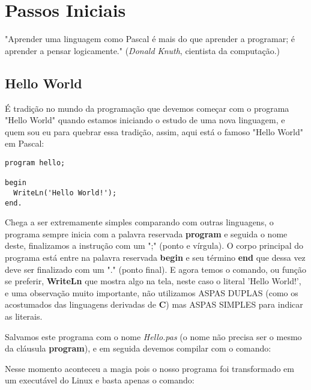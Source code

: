 \chapter{Passos Iniciais}

\begin{remark}
	"Aprender uma linguagem como Pascal é mais do que aprender a programar; é aprender a pensar logicamente." (\textit{Donald Knuth}, cientista da computação.) 
\end{remark}

\section{Hello World}
É tradição no mundo da programação que devemos começar com o programa "Hello World" quando estamos iniciando o estudo de uma nova linguagem, e quem sou eu para quebrar essa tradição, assim, aqui está o famoso "Hello World" em Pascal:
\begin{lstlisting}[]
program hello;

begin
  WriteLn('Hello World!');
end.
\end{lstlisting}

Chega a ser extremamente simples comparando com outras linguagens, o programa sempre inicia com a palavra reservada \textbf{program} e seguida o nome deste, finalizamos a instrução com um ";" (ponto e vírgula). O corpo principal do programa está entre na palavra reservada \textbf{begin} e seu término \textbf{end} que dessa vez deve ser finalizado com um "." (ponto final). E agora temos o comando, ou função se preferir, \textbf{WriteLn} que mostra algo na tela, neste caso o literal 'Hello World!', e uma observação muito importante, não utilizamos ASPAS DUPLAS (como os acostumados das linguagens derivadas de \textbf{C}) mas ASPAS SIMPLES para indicar as literais.

Salvamos este programa com o nome \textit{Hello.pas} (o nome não precisa ser o mesmo da cláusula \textbf{program}), e em seguida devemos compilar com o comando: \\

Nesse momento aconteceu a magia pois o nosso programa foi transformado em um executável do Linux e basta apenas o comando: \\

